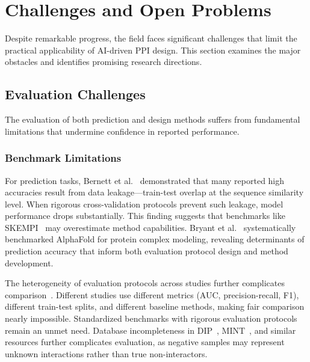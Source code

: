 
\section{Challenges and Open Problems}
\label{sec:challenges}

Despite remarkable progress, the field faces significant challenges that limit the practical applicability of AI-driven PPI design. This section examines the major obstacles and identifies promising research directions.

\subsection{Evaluation Challenges}
\label{subsec:evaluation}

The evaluation of both prediction and design methods suffers from fundamental limitations that undermine confidence in reported performance.

\subsubsection{Benchmark Limitations}

For prediction tasks, Bernett et al.~\cite{bernett2024bias} demonstrated that many reported high accuracies result from data leakage---train-test overlap at the sequence similarity level. When rigorous cross-validation protocols prevent such leakage, model performance drops substantially. This finding suggests that benchmarks like SKEMPI~\cite{jankauskaite2019skempi2} may overestimate method capabilities. Bryant et al.~\cite{bryant2022benchmarking} systematically benchmarked AlphaFold for protein complex modeling, revealing determinants of prediction accuracy that inform both evaluation protocol design and method development.

The heterogeneity of evaluation protocols across studies further complicates comparison~\cite{feng2022frameworks}. Different studies use different metrics (AUC, precision-recall, F1), different train-test splits, and different baseline methods, making fair comparison nearly impossible. Standardized benchmarks with rigorous evaluation protocols remain an unmet need. Database incompleteness in DIP~\cite{salwinski2004dip}, MINT~\cite{chatr2015mint}, and similar resources further complicates evaluation, as negative samples may represent unknown interactions rather than true non-interactors.

